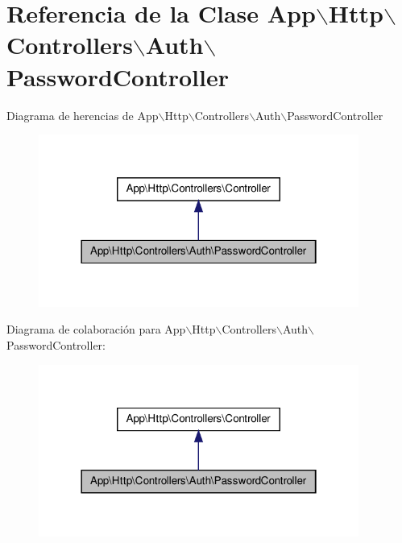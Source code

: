 \hypertarget{class_app_1_1_http_1_1_controllers_1_1_auth_1_1_password_controller}{\section{\-Referencia de la \-Clase \-App$\backslash$\-Http$\backslash$\-Controllers$\backslash$\-Auth$\backslash$\-Password\-Controller}
\label{class_app_1_1_http_1_1_controllers_1_1_auth_1_1_password_controller}
}


\-Diagrama de herencias de \-App$\backslash$\-Http$\backslash$\-Controllers$\backslash$\-Auth$\backslash$\-Password\-Controller
\nopagebreak
\begin{figure}[H]
\begin{center}
\leavevmode
\includegraphics[width=298pt]{class_app_1_1_http_1_1_controllers_1_1_auth_1_1_password_controller__inherit__graph}
\end{center}
\end{figure}


\-Diagrama de colaboración para \-App$\backslash$\-Http$\backslash$\-Controllers$\backslash$\-Auth$\backslash$\-Password\-Controller\-:
\nopagebreak
\begin{figure}[H]
\begin{center}
\leavevmode
\includegraphics[width=298pt]{class_app_1_1_http_1_1_controllers_1_1_auth_1_1_password_controller__coll__graph}
\end{center}
\end{figure}

